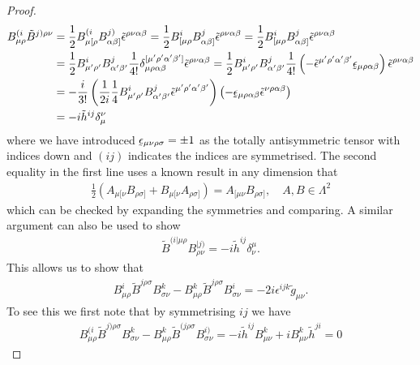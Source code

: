 \documentclass[10pt]{report}
\newcommand{\utilde}[1]{\underaccent{\tilde}{#1}}
\theoremstyle{definition}
\newcommand{\teps}[0]{\tilde{\epsilon}}
\newcommand{\uteps}[0]{\utilde{\epsilon}}
\begin{document}
\begin{proof}
    \begin{align}
        B^{(i}_{\mu\rho} \tilde{B}^{j)\rho\nu} & = \frac{1}{2} B^{(i}_{\mu[\rho} B^{j)}_{\alpha\beta]} \teps^{\rho\nu\alpha\beta} = \frac{1}{2} B^i_{[\mu\rho} B^j_{\alpha\beta]} \teps^{\rho\nu\alpha\beta} = \frac{1}{2} B^i_{[\mu\rho} B^j_{\alpha\beta]}  \teps^{\rho\nu\alpha\beta}  \nonumber\\ & = \frac{1}{2} B^i_{\mu' \rho'} B^j_{\alpha' \beta'} \frac{1}{4!} \delta^{[\mu' \rho' \alpha' \beta']}_{\mu \rho \alpha \beta} \teps^{\rho\nu\alpha\beta} = \frac{1}{2} B^i_{\mu' \rho'} B^j_{\alpha' \beta'} \frac{1}{4!} \left(- \teps^{\mu'\rho'\alpha'\beta'} \uteps_{\mu\rho\alpha\beta} \right) \teps^{\rho\nu\alpha\beta}  \nonumber\\ &  = -\frac{i}{3!} \left( \frac{1}{2 i} \frac{1}{4} B^i_{\mu' \rho'} B^j_{\alpha' \beta'} \teps^{\mu'\rho'\alpha'\beta'} \right) \left( -\uteps_{\mu\rho\alpha\beta} \teps^{\nu\rho\alpha\beta} \right) \nonumber \\ &= -i \tilde{h}^{ij} \delta_\mu^\nu
    \end{align}
    where we have introduced $\uteps_{\mu\nu\rho\sigma} = \pm 1$ as the totally antisymmetric tensor with indices down and $(ij)$ indicates the indices are symmetrised. The second equality in the first line uses a known result in any dimension that 
    \begin{align}
        \frac{1}{2} \left( A_{\mu[\nu} B_{\rho \sigma]} + B_{\mu[\nu} A_{\rho \sigma]} \right) = A_{[\mu\nu} B_{\rho\sigma]}, \quad A,B \in \Lambda^2
    \end{align}
    which can be checked by expanding the symmetries and comparing. A similar argument can also be used to show 
    \begin{align}
        \tilde{B}^{(i|\mu\rho} B^{|j)}_{\rho\nu} = -i \tilde{h}^{ij} \delta^\mu_\nu.
    \end{align}
    This allows us to show that 
    \begin{align}
        B^i_{\mu\rho} \tilde{B}^{j\rho\sigma} B^k_{\sigma\nu} - B^k_{\mu\rho} \tilde{B}^{j\rho\sigma} B^i_{\sigma\nu} = -2i \epsilon^{ijk} \tilde{g}_{\mu\nu}. \label{eq:pleb-BBB-prop-to_eps_g}
    \end{align}
    To see this we first note that by symmetrising $ij$ we have 
    \begin{align}
        B^{(i}_{\mu\rho} \tilde{B}^{j)\rho\sigma} B^k_{\sigma\nu} - B^k_{\mu\rho} \tilde{B}^{(j\rho\sigma} B^{i)}_{\sigma\nu} = -i \tilde{h}^{ij} B^k_{\mu\nu} + i B^k_{\mu\nu} \tilde{h}^{ji} = 0
    \end{align}

\end{proof}
\end{document}
